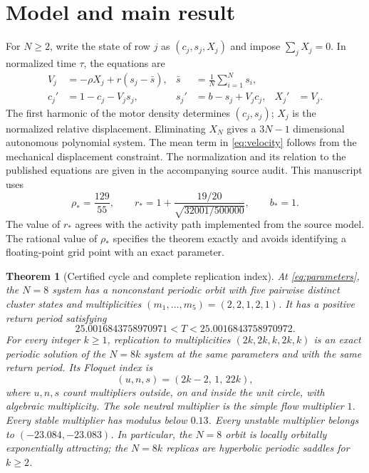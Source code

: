 \documentclass[11pt]{article}
\newtheorem{theorem}{Theorem}
\begin{document}
\section{Model and main result}
For $N\geq2$, write the state of row $j$ as $(c_j,s_j,X_j)$ and impose
$\sum_j X_j=0$. In normalized time $\tau$, the equations are
\begin{align}
 V_j&=-\rho X_j+r(s_j-\bar s),&
 \bar s&=\frac1N\sum_{i=1}^N s_i,\label{eq:velocity}\\
 c_j'&=1-c_j-V_js_j,&
 s_j'&=b-s_j+V_jc_j,& X_j'&=V_j.\label{eq:model}
\end{align}
The first harmonic of the motor density determines $(c_j,s_j)$; $X_j$ is
the normalized relative displacement. Eliminating $X_N$ gives a
$3N-1$ dimensional autonomous polynomial system. The mean term in
\eqref{eq:velocity} follows from the mechanical displacement constraint.
The normalization and its relation to the published equations are given
in the accompanying source audit. This manuscript uses
\begin{equation}
 \rho_* = \frac{129}{55},\qquad
 r_* = 1+\frac{19/20}{\sqrt{32001/500000}},\qquad b_*=1.
 \label{eq:parameters}
\end{equation}
The value of $r_*$ agrees with the activity path implemented from the source
model. The rational value of $\rho_*$ specifies the theorem exactly and
avoids identifying a floating-point grid point with an exact parameter.

\begin{theorem}[Certified cycle and complete replication index]
\label{thm:main}
At \eqref{eq:parameters}, the $N=8$ system has a nonconstant periodic orbit
with five pairwise distinct cluster states and multiplicities
$(m_1,\ldots,m_5)=(2,2,1,2,1)$. It has a positive return period satisfying
\begin{equation}
25.0016843758970971<T<25.0016843758970972.\label{eq:period}
\end{equation}
For every integer $k\geq1$, replication to multiplicities
$(2k,2k,k,2k,k)$ is an exact periodic solution of the $N=8k$ system at
the same parameters and with the same return period. Its Floquet index is
\begin{equation}
 (u,n,s)=(2k-2,\,1,\,22k),\label{eq:index}
\end{equation}
where $u,n,s$ count multipliers outside, on and inside the unit circle,
with algebraic multiplicity. The sole neutral multiplier is the simple
flow multiplier $1$. Every stable multiplier has modulus below $0.13$.
Every unstable multiplier belongs to $(-23.084,-23.083)$.
In particular, the $N=8$ orbit is locally orbitally exponentially attracting;
the $N=8k$ replicas are hyperbolic periodic saddles for $k\geq2$.
\end{theorem}
\end{document}
